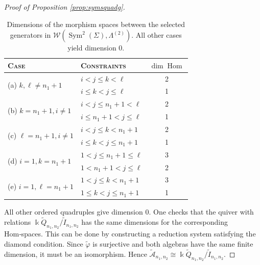 \documentclass[a4paper, reqno, 11pt]{amsart}
\theoremstyle{definition}
\newtheorem{remark}[theorem]{Remark}
\begin{document}
\begin{proof}[Proof of Proposition \ref{prop:symsquadg}]
		\begin{table}[htbp]
			\centering
			\renewcommand{\arraystretch}{1.3}
			\begin{tabular}{llc}
				\hline
				\textsc{Case} & \textsc{Constraints} & $\dim \operatorname{Hom}$ \\
				\hline
				\multirow{2}{*}{\textup{(a)} $k, \ell \neq n_1+1$} 
				& $i < j \le k < \ell$ & 2 \\
				& $i \le k < j \leq \ell$ & 1 \\
				\hline
				\multirow{2}{*}{\textup{(b)} $k = n_1+1, i \neq 1$} 
				& $i < j \le n_1+1 < \ell$ & 2 \\
				& $i \le n_1+1 < j \leq \ell$ & 1 \\
				\hline
				\multirow{2}{*}{\textup{(c)} $\ell = n_1+1, i \neq 1$} 
				& $i < j \le k < n_1+1$ & 2 \\
				& $i \le k < j \le n_1+1$ & 1 \\
				\hline
				\multirow{2}{*}{\textup{(d)} $i = 1, k = n_1+1$} 
				& $1 < j \leq n_1+1 \le \ell$  & 3 \\
				& $1 < n_1+1 < j \leq \ell$ & 2 \\
				\hline
				\multirow{2}{*}{\textup{(e)} $i = 1, \ell = n_1+1$} 
				& $1 < j \le k < n_1+1$ & 3 \\
				& $1 \le k < j \le n_1+1$ & 1 \\
				\hline
			\end{tabular}
			\vspace{2mm}
			\caption{Dimensions of the morphism spaces between the selected generators in $\mathcal{W}(\operatorname{Sym}^2(\Sigma), \Lambda^{(2)})$. All other cases yield dimension 0.}
			\label{tab:dimensions}
		\end{table}
		All other ordered quadruples give dimension $0$. One checks that the quiver with relations $\Bbbk\widetilde Q_{n_1,n_2}/\widetilde I_{n_1,n_2}$ has the same dimensions for the corresponding Hom‑spaces. This can be done by constructing a reduction system satisfying the diamond condition. Since $\widetilde\varphi$ is surjective and both algebras have the same finite dimension, it must be an isomorphism. Hence $\widetilde{\mathcal{A}}_{n_1,n_2}\cong \Bbbk\widetilde Q_{n_1,n_2}/\widetilde I_{n_1,n_2}$.
	\end{proof}
	
	
	
\end{document}
